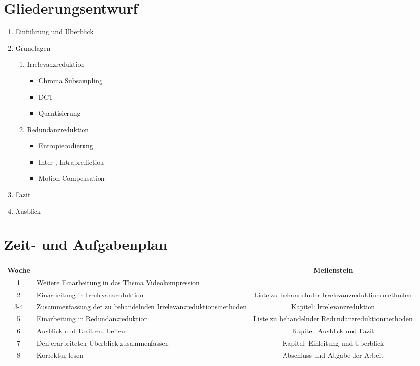 \section{Gliederungsentwurf}

\begin{enumerate}
\setlength\itemsep{-1em} %
\item Einführung und Überblick
\item Grundlagen
\begin{enumerate}
	\setlength\itemsep{-1em} %
	\item Irrelevanzreduktion
	\begin{itemize}
		\setlength\itemsep{-1em} %
		\item Chroma Subsampling
		\item DCT
		\item Quantisierung
	\end{itemize}
	\item Redundanzreduktion
	\begin{itemize}
		\setlength\itemsep{-1em} %
		\item Entropiecodierung
		\item Inter-, Intraprediction
		\item Motion Compensation
	\end{itemize}
\end{enumerate}
\item Fazit
\item Ausblick
\end{enumerate}

\section{Zeit- und Aufgabenplan}
\begin{table}[!h]
\begin{tabularx}{\textwidth}{ |c|X|c| }
  \hline
  \textbf{Woche} & \centering{\textbf{Aufgabe}} & \textbf{Meilenstein}  \\
  \hline 
  1   & Weitere Einarbeitung in das Thema Videokompression &  \\ \hline
  2   & Einarbeitung in Irrelevanzreduktion & Liste zu behandelnder Irrelevanzreduktionsmethoden \\ \hline
  3-4 & Zusammenfassung der zu behandelnden Irrelevanzreduktionsmethoden & Kapitel: Irrelevanzreduktion \\ \hline
  5   & Einarbeitung in Redundanzreduktion & Liste zu behandelnder Redundanzreduktionmethoden \\ \hline
  6   & Ausblick und Fazit erarbeiten & Kapitel: Ausblick und Fazit \\ \hline
  7   & Den erarbeiteten Überblick zusammenfassen & Kapitel: Einleitung und Überblick   \\ \hline
  8  & Korrektur lesen & Abschluss und Abgabe der Arbeit \\ \hline
\end{tabularx}
\end{table}

%
